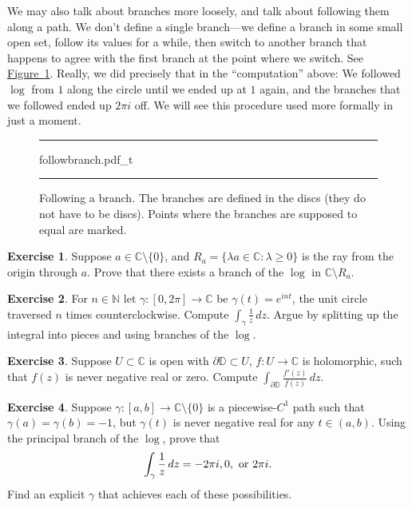 \documentclass[12pt,openany]{book}
\newcommand{\avoidbreak}{\postdisplaypenalty=100}
\newcommand{\C}{{\mathbb{C}}}
\newcommand{\N}{{\mathbb{N}}}
\newcommand{\D}{{\mathbb{D}}}
\newcommand{\myquote}[1]{``#1''}
\theoremstyle{plain}
\theoremstyle{remark}
\theoremstyle{definition}
\newenvironment{exbox}{%
    \def\FrameCommand{\vrule width 1pt \relax\hspace{10pt}}%
    \MakeFramed{\advance\hsize-\width\FrameRestore}%
}{%
    \endMakeFramed
}
\newenvironment{myfig}{%
\begin{figure}[h!t]
\noindent\rule{\textwidth}{0.5pt}\vspace{12pt}\par\centering}%
{\par\noindent\rule{\textwidth}{0.5pt}
\end{figure}}
\theoremstyle{exercise}
\newtheorem{exercise}{Exercise}[section]
\theoremstyle{example}
\newcommand{\figureref}[1]{\hyperref[#1]{Figure~\ref*{#1}}}
\begin{document}
We may also talk about branches more loosely, and talk
about following them along a path.  We don't define
a single branch---we define a branch in some small open set,
follow its values for a while, then switch to another branch that 
happens to agree with the first branch at the point where we
switch.  See \figureref{fig:followbranch}.  Really, we did precisely that in the
\myquote{computation} above:  We followed $\log$ from $1$ along the circle until we
ended up at $1$ again, and the branches that we followed ended up $2\pi i$
off.  We will see this procedure used more formally in just a moment.

\begin{myfig}
{followbranch.pdf_t}
\caption{Following a branch.
The branches are defined in the discs
(they do not have to be discs).
Points where the branches are supposed to equal
are marked.\label{fig:followbranch}}
\end{myfig}

\begin{exbox}
\begin{exercise}
Suppose $a \in \C \setminus \{ 0 \}$, and
$R_a = \{ \lambda a \in \C : \lambda \geq 0 \}$
is the ray from the origin through $a$.  Prove
that there exists a branch of the $\log$ in $\C \setminus R_a$.
\end{exercise}

\begin{exercise}
For $n \in \N$ let $\gamma \colon [0,2\pi] \to \C$ be $\gamma(t) = e^{int}$,
the unit circle traversed $n$ times counterclockwise.  Compute
$\int_\gamma \frac{1}{z} \, dz$.  Argue by splitting up the integral
into pieces and using branches of the $\log$.
\end{exercise}

\begin{exercise}
Suppose
$U \subset \C$ is open with
$\partial \D \subset U$,
$f \colon U \to \C$ is holomorphic,
such that
$f(z)$ is never negative real or zero.
Compute
$\int_{\partial \D} \frac{f'(z)}{f(z)} \, dz$.
\end{exercise}

\begin{exercise}
Suppose $\gamma \colon [a,b] \to \C \setminus \{ 0 \}$ is a piecewise-$C^1$
path such that $\gamma(a) = \gamma(b) = -1$, but $\gamma(t)$ is never
negative real for any $t \in (a,b)$.  Using the principal branch of the
$\log$, prove that
\begin{equation*}
\int_\gamma \frac{1}{z} \, dz = -2\pi i, 0, \text{ or } 2\pi i.
\avoidbreak
\end{equation*}
Find an explicit $\gamma$ that achieves each of these possibilities.
\end{exercise}
\end{exbox}
\end{document}
